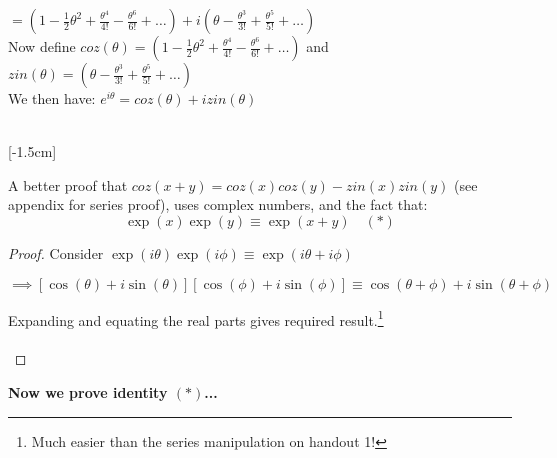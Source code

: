$ = (1 - \frac{1}{2}\theta^2 + \frac{\theta^4}{4!} - \frac{\theta^6}{6!} + \dots) + i(\theta - \frac{\theta^3}{3!} + \frac{\theta^5}{5!} + \dots)$\\

Now define $coz(\theta) = (1 - \frac{1}{2}\theta^2 + \frac{\theta^4}{4!} - \frac{\theta^6}{6!} + \dots)  $ and $zin(\theta) = (\theta - \frac{\theta^3}{3!} + \frac{\theta^5}{5!} + \dots) $\\

We then have: $\boxed{e^{i\theta} = coz(\theta) + izin(\theta)}$\\\\\vspace{15pt}


[-1.5cm]

A better proof that $coz(x+y) = coz(x)coz(y) - zin(x)zin(y)$ (see appendix for series proof), uses complex numbers, and the fact that:
\[\boxed{\exp(x)\exp(y) \equiv \exp(x+y) \quad (*)}\]

\begin{proof}
Consider $\exp(i\theta)\exp(i\phi) \equiv \exp(i\theta + i\phi)$ 

\[\implies [\cos(\theta)+ i\sin(\theta)][\cos(\phi) + i\sin(\phi)] \equiv \cos(\theta + \phi) + i \sin(\theta + \phi)\]

Expanding and equating the real parts gives required result.\footnote{Much easier than the series manipulation on handout 1!
}\\\\ \end{proof}

\textbf{Now we prove identity $(*)$...}

